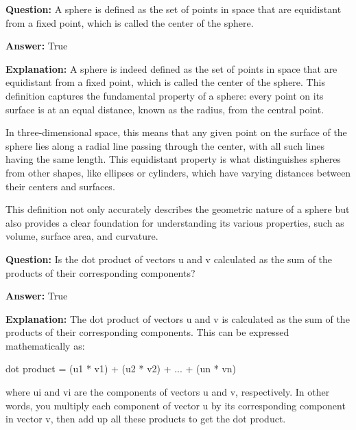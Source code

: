 \documentclass{article}
\begin{document}
                \vspace{0.5cm} 
        
            
                \textbf {Question:} A sphere is defined as the set of points in space that are equidistant from a fixed point, which is called the center of the sphere.
                
                \textbf{Answer:} True

                \textbf{Explanation:} A sphere is indeed defined as the set of points in space that are equidistant from a fixed point, which is called the center of the sphere. This definition captures the fundamental property of a sphere: every point on its surface is at an equal distance, known as the radius, from the central point.

In three-dimensional space, this means that any given point on the surface of the sphere lies along a radial line passing through the center, with all such lines having the same length. This equidistant property is what distinguishes spheres from other shapes, like ellipses or cylinders, which have varying distances between their centers and surfaces.

This definition not only accurately describes the geometric nature of a sphere but also provides a clear foundation for understanding its various properties, such as volume, surface area, and curvature.
                
                \vspace{0.5cm} 
        
            
                \textbf {Question:} Is the dot product of vectors u and v calculated as the sum of the products of their corresponding components?
                
                \textbf{Answer:} True

                \textbf{Explanation:} The dot product of vectors u and v is calculated as the sum of the products of their corresponding components. This can be expressed mathematically as:

dot product = (u1 * v1) + (u2 * v2) + ... + (un * vn)

where ui and vi are the components of vectors u and v, respectively. In other words, you multiply each component of vector u by its corresponding component in vector v, then add up all these products to get the dot product.
                
                \vspace{0.5cm} 
        
\end{document}
